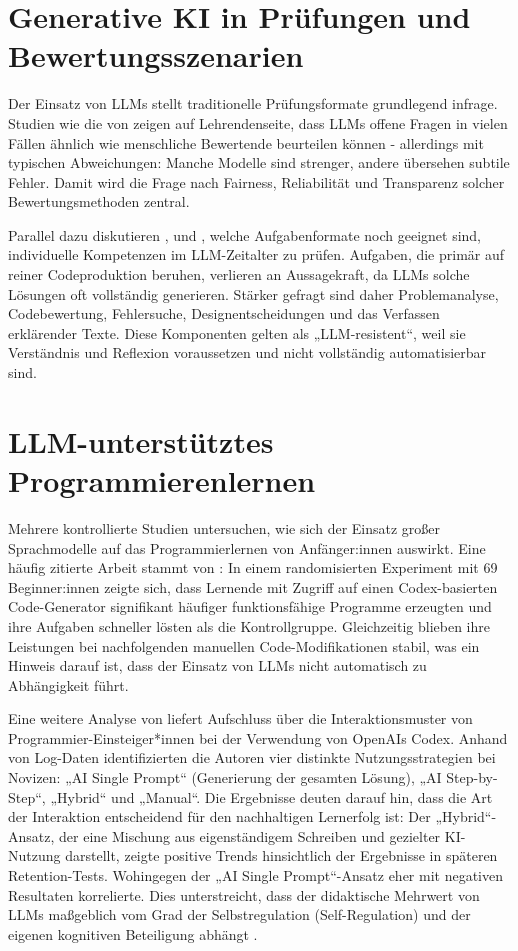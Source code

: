 \section{Generative KI in Prüfungen und Bewertungsszenarien}
Der Einsatz von LLMs stellt traditionelle Prüfungsformate grundlegend infrage. Studien wie die von \textcite[S.~6]{PintoLLMsForEducation} zeigen auf Lehrendenseite, dass LLMs offene Fragen in vielen Fällen ähnlich wie menschliche Bewertende beurteilen können - allerdings mit typischen Abweichungen: Manche Modelle sind strenger, andere übersehen subtile Fehler. Damit wird die Frage nach Fairness, Reliabilität und Transparenz solcher Bewertungsmethoden zentral.

Parallel dazu diskutieren \textcite[S.~1]{DennyPromptProblems2024}, \textcite[S.~1]{MahonGuidelines} und \textcite[S.~108]{PratherRobotsAreHere2023}, welche Aufgabenformate noch geeignet sind, individuelle Kompetenzen im LLM-Zeitalter zu prüfen. Aufgaben, die primär auf reiner Codeproduktion beruhen, verlieren an Aussagekraft, da LLMs solche Lösungen oft vollständig generieren. Stärker gefragt sind daher Problemanalyse, Codebewertung, Fehlersuche, Designentscheidungen und das Verfassen erklärender Texte. Diese Komponenten gelten als „LLM-resistent“, weil sie Verständnis und Reflexion voraussetzen und nicht vollständig automatisierbar sind.


\section{LLM-unterstütztes Programmierenlernen}
Mehrere kontrollierte Studien untersuchen, wie sich der Einsatz großer Sprachmodelle auf das Programmierlernen von Anfänger:innen auswirkt. Eine häufig zitierte Arbeit stammt von \textcite[S.~11]{KazemitabaarSupportLearners2023}: In einem randomisierten Experiment mit 69 Beginner:innen zeigte sich, dass Lernende mit Zugriff auf einen Codex-basierten Code-Generator signifikant häufiger funktionsfähige Programme erzeugten und ihre Aufgaben schneller lösten als die Kontrollgruppe. Gleichzeitig blieben ihre Leistungen bei nachfolgenden manuellen Code-Modifikationen stabil, was ein Hinweis darauf ist, dass der Einsatz von LLMs nicht automatisch zu Abhängigkeit führt.

Eine weitere Analyse von \textcite[S.~1]{kazemitabaar_how_2023} liefert Aufschluss über die Interaktionsmuster von Programmier-Einsteiger*innen bei der Verwendung von OpenAIs Codex. Anhand von Log-Daten identifizierten die Autoren vier distinkte Nutzungsstrategien bei Novizen: „AI Single Prompt“ (Generierung der gesamten Lösung), „AI Step-by-Step“, „Hybrid“ und „Manual“. Die Ergebnisse deuten darauf hin, dass die Art der Interaktion entscheidend für den nachhaltigen Lernerfolg ist: Der „Hybrid“-Ansatz, der eine Mischung aus eigenständigem Schreiben und gezielter KI-Nutzung darstellt, zeigte positive Trends hinsichtlich der Ergebnisse in späteren Retention-Tests. Wohingegen der „AI Single Prompt“-Ansatz eher mit negativen Resultaten korrelierte. Dies unterstreicht, dass der didaktische Mehrwert von LLMs maßgeblich vom Grad der Selbstregulation (Self-Regulation) und der eigenen kognitiven Beteiligung abhängt \parencite[S.~12]{kazemitabaar_how_2023}.

